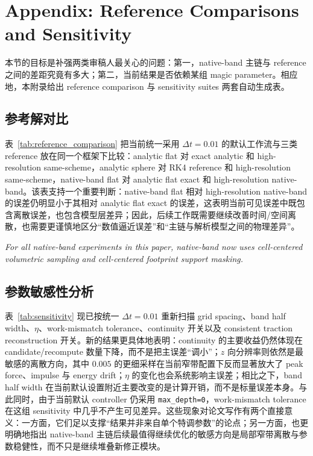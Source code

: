 

\section{Appendix: Reference Comparisons and Sensitivity}
本节的目标是补强两类审稿人最关心的问题：第一，native-band 主链与 reference 之间的差距究竟有多大；第二，当前结果是否依赖某组 magic parameter。相应地，本附录给出 reference comparison 与 sensitivity suites 两套自动生成表。

\subsection{参考解对比}
表~\ref{tab:reference_comparison} 把当前统一采用 $\Delta t = 0.01$ 的默认工作流与三类 reference 放在同一个框架下比较：analytic flat 对 exact analytic 和 high-resolution same-scheme，analytic sphere 对 RK4 reference 和 high-resolution same-scheme，native-band flat 对 analytic flat exact 和 high-resolution native-band。该表支持一个重要判断：native-band flat 相对 high-resolution native-band 的误差仍明显小于其相对 analytic flat exact 的误差，这表明当前可见误差中既包含离散误差，也包含模型层差异；因此，后续工作既需要继续改善时间/空间离散，也需要更谨慎地区分“数值逼近误差”和“主链与解析模型之间的物理差异”。

\noindent\textit{For all native-band experiments in this paper, native-band now uses cell-centered volumetric sampling and cell-centered footprint support masking.}



\subsection{参数敏感性分析}
表~\ref{tab:sensitivity} 现已按统一 $\Delta t = 0.01$ 重新扫描 grid spacing、band half width、$\eta$、work-mismatch tolerance、continuity 开关以及 consistent traction reconstruction 开关。新的结果更具体地表明：continuity 的主要收益仍然体现在 candidate/recompute 数量下降，而不是把主误差“调小”；$z$ 向分辨率则依然是最敏感的离散方向，其中 $0.005$ 的更细采样在当前窄带配置下反而显著放大了 peak force、impulse 与 energy drift；$\eta$ 的变化也会系统影响主误差；相比之下，band half width 在当前默认设置附近主要改变的是计算开销，而不是标量误差本身。与此同时，由于当前默认 controller 仍采用 \texttt{max\_depth=0}，work-mismatch tolerance 在这组 sensitivity 中几乎不产生可见差异。这些现象对论文写作有两个直接意义：一方面，它们足以支撑“结果并非来自单个特调参数”的论点；另一方面，也更明确地指出 native-band 主链后续最值得继续优化的敏感方向是局部窄带离散与参数稳健性，而不只是继续堆叠新修正模块。

